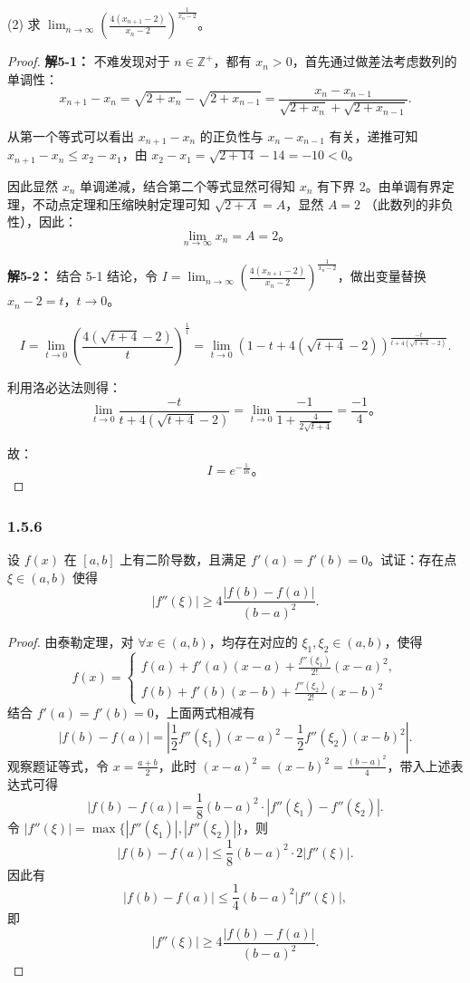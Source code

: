 \documentclass[12pt]{ctexart}
\begin{document}
(2) 求 $\lim_{n \to \infty} \left( \frac{4(x_{n+1} - 2)}{x_n - 2} \right)^{\frac{1}{x_n - 2}}$。
\begin{proof}

\textbf{解5-1：} 不难发现对于 $n \in \mathbb{Z}^+$，都有 $x_n > 0$，首先通过做差法考虑数列的单调性：
\[
x_{n+1} - x_n = \sqrt{2 + x_n} - \sqrt{2 + x_{n-1}} = \frac{x_n - x_{n-1}}{\sqrt{2 + x_n} + \sqrt{2 + x_{n-1}}}.
\]

从第一个等式可以看出 $x_{n+1} - x_n$ 的正负性与 $x_n - x_{n-1}$ 有关，递推可知 $x_{n+1} - x_n \leq x_2 - x_1$，由 $x_2 - x_1 = \sqrt{2 + 14} - 14 = -10 < 0$。

因此显然 $x_n$ 单调递减，结合第二个等式显然可得知 $x_n$ 有下界 2。由单调有界定理，不动点定理和压缩映射定理可知 $\sqrt{2 + A} = A$，显然 $A = 2$ （此数列的非负性），因此：
\[
\lim_{n \to \infty} x_n = A = 2。
\]

\textbf{解5-2：} 结合 5-1 结论，令 $I = \lim_{n \to \infty} \left( \frac{4(x_{n+1} - 2)}{x_n - 2} \right)^{\frac{1}{x_n - 2}}$，做出变量替换 $x_n - 2 = t$，$t \to 0$。

\[
I = \lim_{t \to 0} \left( \frac{4(\sqrt{t+4} - 2)}{t} \right)^{\frac{1}{t}} = \lim_{t \to 0} \left( 1 - t + 4(\sqrt{t + 4} - 2) \right)^{\frac{-t}{t + 4(\sqrt{t + 4} - 2)}}.
\]

利用洛必达法则得：
\[
\lim_{t \to 0} \frac{-t}{t + 4(\sqrt{t + 4} - 2)} = \lim_{t \to 0} \frac{-1}{1 + \frac{4}{2\sqrt{t + 4}}} = \frac{-1}{4}。
\]

故：
\[
I = e^{-\frac{1}{16}}。
\]
\end{proof}

\subsubsection*{1.5.6}
设 $f(x)$ 在 $[a,b]$ 上有二阶导数，且满足 $f'(a) = f'(b) = 0$。试证：存在点 $\xi \in (a,b)$ 使得
\[
|f''(\xi)| \geq 4 \frac{|f(b) - f(a)|}{(b-a)^2}.
\]
\begin{proof}
由泰勒定理，对 $\forall x \in (a,b)$，均存在对应的 $\xi_1, \xi_2 \in (a,b)$，使得
\[
f(x) = 
\begin{cases}
f(a) + f'(a)(x-a) + \frac{f''(\xi_1)}{2!}(x-a)^2, \\
f(b) + f'(b)(x-b) + \frac{f''(\xi_2)}{2!}(x-b)^2
\end{cases}
\]
结合 $f'(a) = f'(b) = 0$，上面两式相减有
\[
|f(b) - f(a)| = \left| \frac{1}{2} f''(\xi_1)(x-a)^2 - \frac{1}{2}f''(\xi_2)(x-b)^2 \right|.
\]
观察题证等式，令 $x = \frac{a+b}{2}$，此时 $(x-a)^2 = (x-b)^2 = \frac{(b-a)^2}{4}$，带入上述表达式可得
\[
|f(b) - f(a)| = \frac{1}{8}(b-a)^2 \cdot |f''(\xi_1) - f''(\xi_2)|.
\]
令 $|f''(\xi)| = \max\{|f''(\xi_1)|, |f''(\xi_2)|\}$，则
\[
|f(b) - f(a)| \leq \frac{1}{8}(b-a)^2 \cdot 2|f''(\xi)|.
\]
因此有
\[
|f(b) - f(a)| \leq \frac{1}{4}(b-a)^2 |f''(\xi)|,
\]
即
\[
|f''(\xi)| \geq 4 \frac{|f(b) - f(a)|}{(b-a)^2}.
\]
\end{proof}
\end{document}
